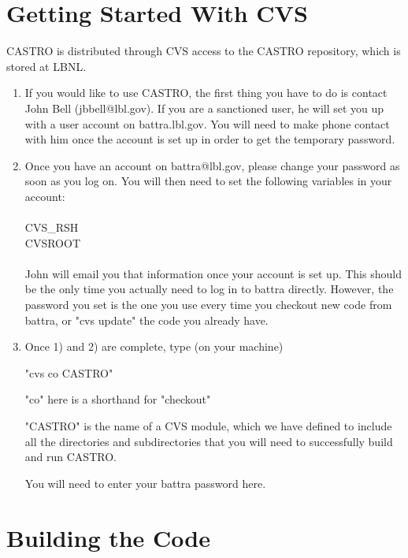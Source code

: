 
\section{Getting Started With CVS}

CASTRO is distributed through CVS access to the CASTRO repository, which is stored at LBNL.
\begin{enumerate}
\item If you would like to use CASTRO, the first thing you have to do is contact John Bell (jbbell@lbl.gov). If you are a sanctioned user, he will set you up with a user account on battra.lbl.gov. You will need to make phone contact with him once the account is set up in order to get the temporary password.
\item Once you have an account on battra@lbl.gov, please change your password as soon as you log on. You will then need to set the following variables in your account:\\ \\
CVS\_RSH \\
CVSROOT \\ \\
John will email you that information once your account is set up. This should be the only time you actually need to log in to battra directly. However, the password you set is the one you use every time you checkout new code from battra, or "cvs update" the code you already have.
\item Once 1) and 2) are complete, type (on your machine)

"cvs co CASTRO"

"co" here is a shorthand for "checkout"

"CASTRO" is the name of a CVS module, which we have defined to include all the directories and subdirectories that you will need to successfully build and run CASTRO.

You will need to enter your battra password here.

\end{enumerate}

\section{Building the Code}


